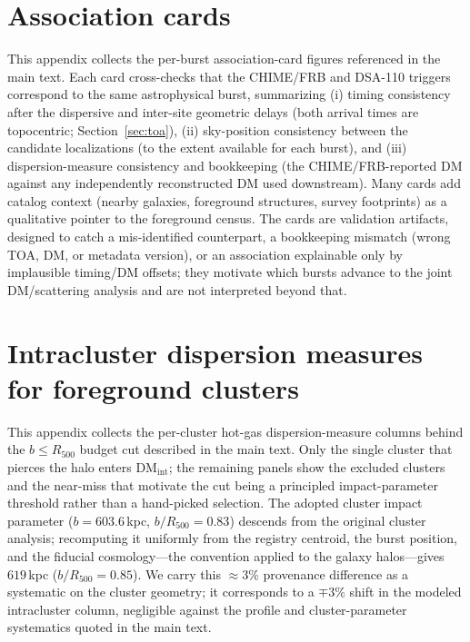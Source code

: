 \section{Association cards}
\label{app:assoc-cards}

This appendix collects the per-burst association-card figures referenced in
the main text. Each card cross-checks that the CHIME/FRB and DSA-110 triggers
correspond to the same astrophysical burst, summarizing (i) timing consistency
after the dispersive and inter-site geometric delays (both arrival times are
topocentric; Section~\ref{sec:toa}), (ii) sky-position consistency between the
candidate localizations (to the extent available for each burst), and (iii)
dispersion-measure consistency and
bookkeeping (the CHIME/FRB-reported DM against any independently reconstructed
DM used downstream). Many cards add catalog context (nearby galaxies,
foreground structures, survey footprints) as a qualitative pointer to the
foreground census. The cards are validation artifacts, designed to catch a
mis-identified counterpart, a bookkeeping mismatch (wrong TOA, DM, or metadata
version), or an association explainable only by implausible timing/DM offsets;
they motivate which bursts advance to the joint DM/scattering analysis and are
not interpreted beyond that.

\clearpage

\clearpage

\FloatBarrier

\section{Intracluster dispersion measures for foreground clusters}
\label{app:clusters}

This appendix collects the per-cluster hot-gas dispersion-measure columns behind the
$b\le R_{500}$ budget cut described in the main text. Only the single cluster
that pierces the halo enters $\mathrm{DM_{int}}$; the remaining panels show the
excluded clusters and the near-miss that motivate the cut being a principled
impact-parameter threshold rather than a hand-picked selection.
The adopted cluster impact parameter ($b=603.6$\,kpc, $b/R_{500}=0.83$)
descends from the original cluster analysis; recomputing it uniformly from
the registry centroid, the burst position, and the fiducial cosmology---the
convention applied to the galaxy halos---gives $619$\,kpc
($b/R_{500}=0.85$). We carry this $\approx3\%$ provenance difference as a
systematic on the cluster geometry; it corresponds to a $\mp3\%$ shift in
the modeled intracluster column, negligible against the profile and
cluster-parameter systematics quoted in the main text.

